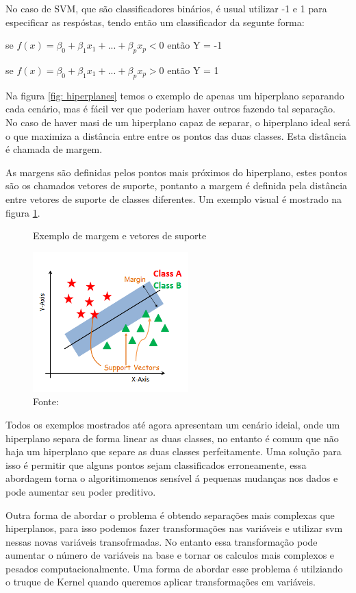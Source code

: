 \documentclass[12pt,a4paper]{article}
\begin{document}
No caso de SVM, que são classificadores binários, é usual utilizar  -1 e 1 para especificar as respóstas, tendo então um classificador da segunte forma:

se $f(x) = \beta_0 + \beta_1x_1 + ... + \beta_px_p  < 0$ então Y = -1


se $f(x) = \beta_0 + \beta_1x_1 + ... + \beta_px_p  > 0$ então Y = 1

Na figura \ref{fig: hiperplanes} temos o exemplo de apenas um hiperplano separando cada cenário, mas é fácil ver que poderiam haver outros fazendo tal separação. No caso de haver masi de um hiperplano capaz de separar, o hiperplano ideal será o que maximiza a distância entre entre os pontos das duas classes. Esta distância é chamada de margem.

As margens são definidas pelos pontos mais próximos do hiperplano, estes pontos são os chamados vetores de suporte, pontanto a margem é definida pela distância entre vetores de suporte de classes diferentes. Um exemplo visual é mostrado na figura \ref{fig: marginsSuportVerctorExample}.

\begin{figure}[ht]
\centering
\caption{Exemplo de margem e vetores de suporte}
  \includegraphics[width=6cm]{"images/marginsSuportVerctorExample.png"}
  \centering
\caption*{Fonte: }%
\label{fig: marginsSuportVerctorExample}
\end{figure}

Todos os exemplos mostrados até agora apresentam um cenário ideial, onde um hiperplano separa de forma linear as duas classes, no entanto é comum que não haja um hiperplano que separe as duas classes perfeitamente. Uma solução para isso é permitir que alguns pontos sejam classificados erroneamente, essa abordagem torna o algoritimomenos sensível á pequenas mudanças nos dados e pode aumentar seu poder preditivo.

Outra forma de abordar o problema é obtendo separações mais complexas que hiperplanos, para isso podemos fazer transformações nas variáveis e utilizar svm nessas novas variáveis transofrmadas. No entanto essa transformação pode aumentar o número de variáveis na base e tornar os calculos mais complexos e pesados computacionalmente. Uma forma de abordar esse problema é utilziando o truque de Kernel quando queremos aplicar transformações em variáveis.
\end{document}
